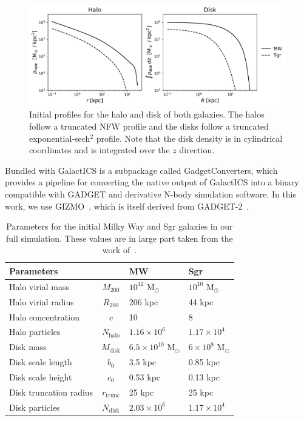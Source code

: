 \begin{figure}
    \centering
    \includegraphics[width=0.9\linewidth]{figs/init_profiles.pdf}
    \caption{%
        Initial profiles for the halo and disk of both galaxies. The halos
        follow a truncated NFW profile and the disks follow a truncated
        exponential-sech$^2$ profile. Note that the disk density is in
        cylindrical coordinates and is integrated over the $z$ direction.
    }
    \label{fig:init_profiles}
\end{figure}

Bundled with GalactICS is a subpackage called GadgetConverters, which
provides a pipeline for converting the native output of GalactICS into a
binary compatible with GADGET and derivative N-body simulation software. In
this work, we use GIZMO~\cite{hopkins_new_2015}, which is itself derived from
GADGET-2~\cite{springel_cosmological_2005}.

\begin{table}
\centering
\begin{tabular}{lcll}
    \toprule
    Parameters & & MW & Sgr \\
    \midrule 
    Halo virial mass & $M_{200}$ & $10^{12}$ M$_\odot$ & $10^{10}$ M$_\odot$ \\
    Halo virial radius & $R_{200}$ & 206 kpc & 44 kpc \\
    Halo concentration & $c$ & 10 & 8 \\
    Halo particles & $N_{\text{halo}}$ & $1.16 \times 10^{6}$ & $1.17 \times 10^{4}$ \\
    Disk mass & $M_{\text{disk}}$ & $6.5 \times 10^{10}$ M$_\odot$ & $6 \times 10^{8}$ M$_\odot$ \\
    Disk scale length & $b_0$ & 3.5 kpc & 0.85 kpc \\
    Disk scale height & $c_0$ & 0.53 kpc & 0.13 kpc \\
    Disk truncation radius & $r_{\text{trunc}}$ & 25 kpc & 25 kpc \\
    Disk particles & $N_{\text{disk}}$ & $2.03 \times 10^{6}$ & $1.17 \times
    10^{4}$ \\
    \bottomrule
\end{tabular}
\caption{%
    Parameters for the initial Milky Way and Sgr galaxies in our full
    simulation. These values are in large part taken from the work
    of~\cite{dierickx_predicted_2017}.
}
\label{tab:sim_params}
\end{table}

